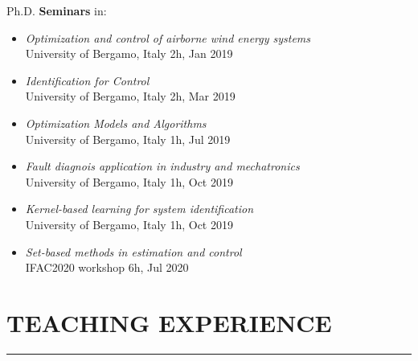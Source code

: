 \documentclass[10pt]{article}
\newcommand{\cvsection}[1]{\section*{\centering\normalsize\uppercase{#1}}\vspace{-16pt}\rule{\linewidth}{0.2pt}\vspace{6pt}}
\begin{document}
Ph.D. \textbf{Seminars} in:
\begin{itemize}
	\setlength\itemsep{-3pt}
	\renewcommand\labelitemi{$\vcenter{\hbox{\tiny$\bullet$}}$}
	\item \textit{Optimization and control of airborne wind energy systems}\\
	University of Bergamo, Italy \hfill 2h, Jan 2019\\
	\item \textit{Identification for Control}\\
	University of Bergamo, Italy \hfill 2h, Mar 2019\\
	\item \textit{Optimization Models and Algorithms}\\
	University of Bergamo, Italy \hfill 1h, Jul 2019\\
	\item \textit{Fault diagnois application in industry and mechatronics}\\
	University of Bergamo, Italy \hfill 1h, Oct 2019\\
	\item \textit{Kernel-based learning for system identification}\\
	University of Bergamo, Italy \hfill 1h, Oct 2019\\
	\item \textit{Set-based methods in estimation and control }\\
	IFAC2020 workshop \hfill 6h, Jul 2020\\
\end{itemize}

\clearpage


\cvsection{teaching experience}
\end{document}
